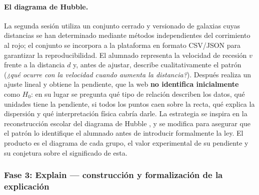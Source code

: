 \paragraph{El diagrama de Hubble.} La segunda sesión utiliza un conjunto cerrado y versionado de galaxias cuyas distancias se han determinado mediante métodos independientes del corrimiento al rojo; el conjunto se incorpora a la plataforma en formato CSV/JSON para garantizar la reproducibilidad. El alumnado representa la velocidad de recesión $v$ frente a la distancia $d$ y, antes de ajustar, describe cualitativamente el patrón (\emph{¿qué ocurre con la velocidad cuando aumenta la distancia?}). Después realiza un ajuste lineal y obtiene la pendiente, que la web \textbf{no identifica inicialmente} como $H_0$: en su lugar se pregunta qué tipo de relación describen los datos, qué unidades tiene la pendiente, si todos los puntos caen sobre la recta, qué explica la dispersión y qué interpretación física cabría darle. La estrategia se inspira en la reconstrucción escolar del diagrama de Hubble \parencite{cardona2016}, y se modifica para asegurar que el patrón lo identifique el alumnado antes de introducir formalmente la ley. El producto es el diagrama de cada grupo, el valor experimental de su pendiente y su conjetura sobre el significado de esta.

\subsubsection{Fase 3: Explain --- construcción y formalización de la explicación}\label{sec:explain}

